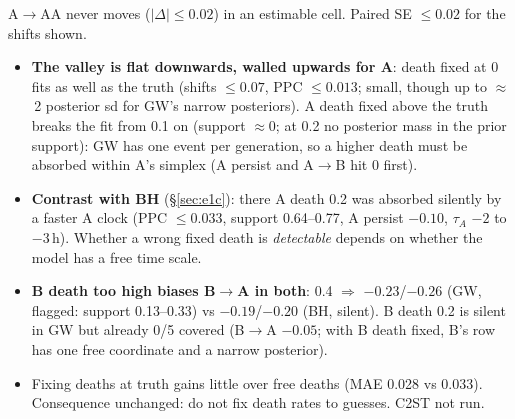\documentclass[10pt,a4paper]{article}
\newcommand{\tA}{$\tau_A$}
\newcommand{\blk}[1]{\par\needspace{5\baselineskip}\smallskip{\sffamily\bfseries\color{inkgray}#1}\par}
\newcommand{\Comment}{\blk{Comment}}
\begin{document}
A$\to$AA never moves ($|\Delta| \le 0.02$) in an estimable cell. Paired SE $\le 0.02$ for the shifts shown.
\Comment
\begin{itemize}
\item \textbf{The valley is flat downwards, walled upwards for A}: death fixed at 0 fits as well as the truth (shifts $\le 0.07$, PPC $\le 0.013$; small, though up to $\approx$\,2 posterior sd for GW's narrow posteriors). A death fixed above the truth breaks the fit from 0.1 on (support $\approx 0$; at 0.2 no posterior mass in the prior support): GW has one event per generation, so a higher death must be absorbed within A's simplex (A persist and A$\to$B hit 0 first).
\item \textbf{Contrast with BH} (\S\ref{sec:e1c}): there A death 0.2 was absorbed silently by a faster A clock (PPC $\le 0.033$, support 0.64--0.77, A persist $-0.10$, \tA{} $-2$ to $-3$\,h). Whether a wrong fixed death is \emph{detectable} depends on whether the model has a free time scale.
\item \textbf{B death too high biases B$\to$A in both}: 0.4 $\Rightarrow$ $-0.23$/$-0.26$ (GW, flagged: support 0.13--0.33) vs $-0.19$/$-0.20$ (BH, silent). B death 0.2 is silent in GW but already 0/5 covered (B$\to$A $-0.05$; with B death fixed, B's row has one free coordinate and a narrow posterior).
\item Fixing deaths at truth gains little over free deaths (MAE 0.028 vs 0.033). Consequence unchanged: do not fix death rates to guesses. C2ST not run.
\end{itemize}

\end{document}
